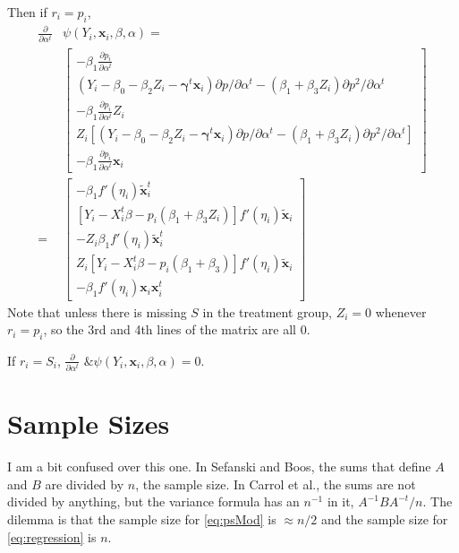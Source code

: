 \documentclass[11pt]{article} %
\begin{document}
Then if $r_i=p_i$,
\begin{align*}
  \frac{\partial}{\partial \alpha^t}&\psi(Y_i,\bm{x}_i,\beta,\alpha)=\\
  &\left[\begin{array}{c}
          -\beta_1\frac{\partial p_i}{\partial \alpha^t}\\
          (Y_i-\beta_0-\beta_2Z_i-\bm{\gamma}^t\bm{x}_{i})\partial p/\partial\alpha^t-(\beta_1+\beta_3Z_i)\partial p^2/\partial \alpha^t\\
          -\beta_1\frac{\partial p_i}{\partial \alpha^t}Z_i\\
          Z_i\left[(Y_i-\beta_0-\beta_2Z_i-\bm{\gamma}^t\bm{x}_{i})\partial p/\partial\alpha^t-(\beta_1+\beta_3Z_i)\partial p^2/\partial \alpha^t\right]\\
          -\beta_1\frac{\partial p_i}{\partial \alpha^t}\bm{x}_i
        \end{array}\right]\\
  =& \left[\begin{array}{c}
          -\beta_1f'(\eta_i)\bm{\tilde{x}}_i^t\\
          \left[Y_i-X_i^t\beta-p_i(\beta_1+\beta_3Z_i)\right]f'(\eta_i)\bm{\tilde{x}}_i\\
          -Z_i\beta_1f'(\eta_i)\bm{\tilde{x}}_i^t\\
          Z_i\left[Y_i-X_i^t\beta-p_i(\beta_1+\beta_3)\right]f'(\eta_i)\bm{\tilde{x}}_i\\
          -\beta_1f'(\eta_i)\bm{x}_i\bm{x}_i^t
           \end{array}\right]
\end{align*}
Note that unless there is missing $S$ in the treatment group, $Z_i=0$ whenever $r_i=p_i$, so the 3rd and 4th lines of the matrix are all 0.

If $r_i=S_i$, $\frac{\partial}{\partial \alpha^t}\text{ \& }\psi(Y_i,\bm{x}_i,\beta,\alpha)=0$.

\section{Sample Sizes}

I am a bit confused over this one.
In Sefanski and Boos, the sums that define $A$ and $B$ are divided by $n$, the sample size.
In Carrol et al., the sums are not divided by anything, but the variance formula has an $n^{-1}$ in it, $A^{-1}BA^{-t}/n$.
The dilemma is that the sample size for \eqref{eq:psMod} is $\approx n/2$ and the sample size for \eqref{eq:regression} is $n$.
\end{document}
